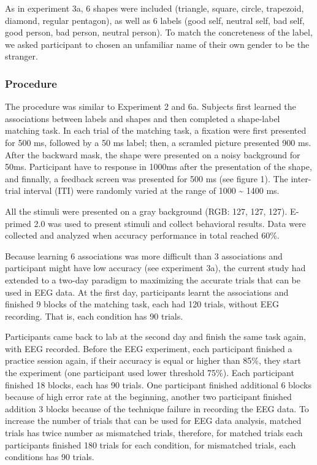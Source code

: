 \documentclass[man]{apa6}
\begin{document}
As in experiment 3a, 6 shapes were included (triangle, square, circle, trapezoid, diamond, regular pentagon), as well as 6 labels (good self, neutral self, bad self, good person, bad person, neutral person). To match the concreteness of the label, we asked participant to chosen an unfamiliar name of their own gender to be the stranger.

\hypertarget{procedure-10}{%
\subsubsection{Procedure}\label{procedure-10}}

The procedure was similar to Experiment 2 and 6a. Subjects first learned the associations between labels and shapes and then completed a shape-label matching task. In each trial of the matching task, a fixation were first presented for 500 ms, followed by a 50 ms label; then, a scramled picture presented 900 ms. After the backward mask, the shape were presented on a noisy background for 50ms. Participant have to response in 1000ms after the presentation of the shape, and finnally, a feedback screen was presented for 500 ms (see figure 1). The inter-trial interval (ITI) were randomly varied at the range of 1000 \textasciitilde{} 1400 ms.

All the stimuli were presented on a gray background (RGB: 127, 127, 127). E-primed 2.0 was used to present stimuli and collect behavioral results. Data were collected and analyzed when accuracy performance in total reached 60\%.

Because learning 6 associations was more difficult than 3 associations and participant might have low accuracy (see experiment 3a), the current study had extended to a two-day paradigm to maximizing the accurate trials that can be used in EEG data. At the first day, participants learnt the associations and finished 9 blocks of the matching task, each had 120 trials, without EEG recording. That is, each condition has 90 trials.

Participants came back to lab at the second day and finish the same task again, with EEG recorded. Before the EEG experiment, each participant finished a practice session again, if their accuracy is equal or higher than 85\%, they start the experiment (one participant used lower threshold 75\%). Each participant finished 18 blocks, each has 90 trials. One participant finished additional 6 blocks because of high error rate at the beginning, another two participant finished addition 3 blocks because of the technique failure in recording the EEG data. To increase the number of trials that can be used for EEG data analysis, matched trials has twice number as mismatched trials, therefore, for matched trials each participants finished 180 trials for each condition, for mismatched trials, each conditions has 90 trials.
\end{document}
